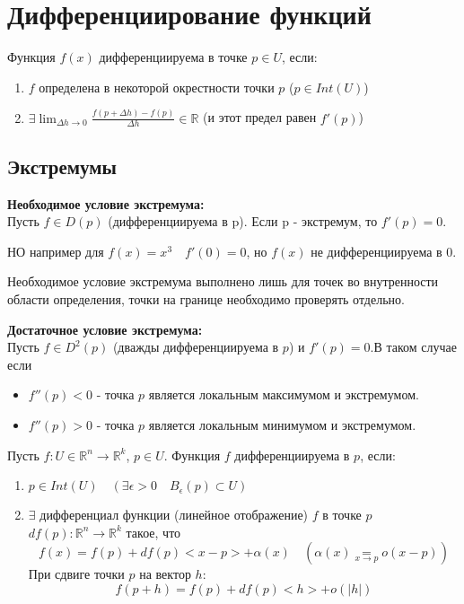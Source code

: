 \section{Дифференциирование функций}

    
\begin{definition}
    Функция $f(x)$ дифференциируема в точке $p \in U$, если:
    \begin{enumerate}
        \item $f$  определена в некоторой окрестности точки $p$ ($p \in Int(U)$)
        \item $\exists \lim_{\Delta h \to 0} \frac{f(p + \Delta h) - f(p)}{\Delta h} \in \mathbb{R} $ (и этот предел равен $f'(p)$)
    \end{enumerate}
\end{definition}

\subsection{Экстремумы}
\medskip
\textbf{Необходимое условие экстремума:}\\
Пусть $f \in D(p)$ (дифференциируема в p). Если p - экстремум, то $f'(p) = 0$.

\begin{note}
    НО например для $f(x) = x^{3} \quad f'(0) = 0$, но $f(x)$ не дифференциируема в 0.
\end{note}
\begin{note}
Необходимое условие экстремума выполнено лишь для точек во внутренности области определения,
точки на границе необходимо проверять отдельно.
\end{note}


\textbf{Достаточное условие экстремума:}\\
Пусть $f \in D^{2}(p)$ (дважды дифференциируема в $p$) и $f'(p) = 0$.В таком случае если
\begin{itemize}
    \item $f''(p) < 0$ - точка $p$ является локальным максимумом и экстремумом.
    \item $f''(p) > 0$ - точка $p$ является локальным минимумом и экстремумом.
\end{itemize} 

\medskip
Пусть $f:U \in \mathbb{R}^{n} \to \mathbb{R}^{k}$, $p \in U$. 
Функция $f$ дифференциируема в $p$, если:
\begin{enumerate}
    \item $p \in Int(U) \quad
        (\exists \epsilon > 0 \quad B_\epsilon(p) \subset U)$
    \item $\exists$ дифференциал функции (линейное отображение)
    $f$ в точке $p$ \quad $df(p): \mathbb{R}^{n} \to \mathbb{R}^{k}$
    такое, что    \[f(x) = f(p) + df(p)<x-p> + \alpha(x) \quad (\alpha(x) \underset{x \to p}{=} o(x-p)) \]
    При сдвиге точки $p$ на вектор $h$: \[f(p+h) = f(p) + df(p)<h> + o(|h|)\]
\end{enumerate}

